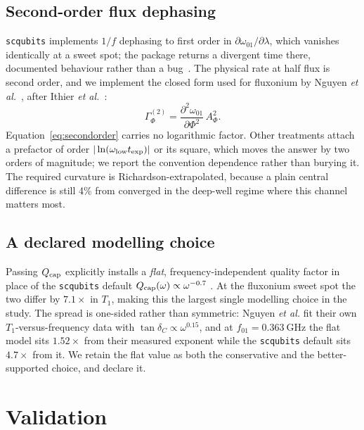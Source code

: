 \documentclass[journal]{IEEEtran}
\begin{document}
\subsection{Second-order flux dephasing}

\texttt{scqubits} implements $1/f$ dephasing to first order in
$\partial\omega_{01}/\partial\lambda$, which vanishes identically at a sweet spot; the
package returns a divergent time there, documented behaviour rather than a
bug~\cite{groszkowski2021}. The physical rate at half flux is second order, and we implement
the closed form used for fluxonium by Nguyen \emph{et al.}~\cite{nguyen2019}, after
Ithier \emph{et al.}~\cite{ithier2005}:
\begin{equation}
\Gamma_\Phi^{(2)} = \frac{\partial^2\omega_{01}}{\partial\Phi^2}\, A_\Phi^2 .
\label{eq:secondorder}
\end{equation}
Equation~\eqref{eq:secondorder} carries no logarithmic factor. Other treatments attach a
prefactor of order $|\ln(\omega_{\rm low}t_{\rm exp})|$ or its square, which moves the answer
by two orders of magnitude; we report the convention dependence rather than burying it. The
required curvature is Richardson-extrapolated, because a plain central difference is still
4\% from converged in the deep-well regime where this channel matters most.

\subsection{A declared modelling choice}

Passing $Q_{\rm cap}$ explicitly installs a \emph{flat}, frequency-independent quality factor
in place of the \texttt{scqubits} default $Q_{\rm cap}(\omega) \propto \omega^{-0.7}$
\cite{smith2020}. At the fluxonium sweet spot the two differ by $7.1\times$ in $T_1$, making
this the largest single modelling choice in the study. The spread is one-sided rather than
symmetric: Nguyen \emph{et al.} fit their own $T_1$-versus-frequency data with
$\tan\delta_C \propto \omega^{0.15}$, and at $f_{01} = \SI{0.363}{\giga\hertz}$ the flat
model sits $1.52\times$ from their measured exponent while the \texttt{scqubits} default sits
$4.7\times$ from it. We retain the flat value as both the conservative and the
better-supported choice, and declare it.

\section{Validation}
\label{sec:validation}
\end{document}
